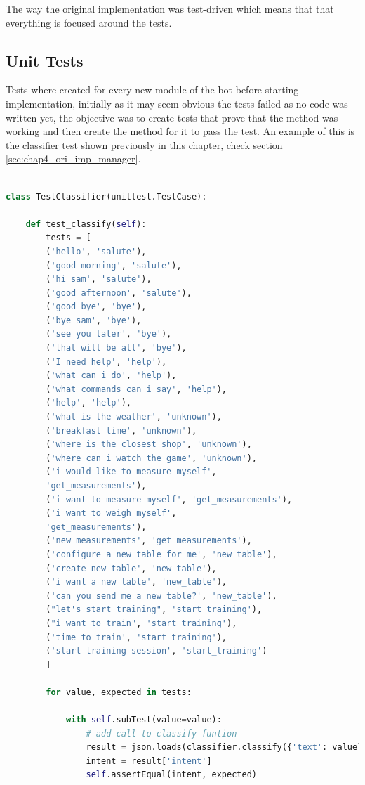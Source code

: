 The way the original implementation was test-driven which means that that everything is focused around the tests.

\subsection{Unit Tests}\label{sec:chap4_test_unit}

Tests where created for every new module of the bot before starting implementation, initially as it may seem obvious the tests failed as no code was written yet, the objective was to create tests that prove that the method was working and then create the method for it to pass the test. An example of this is the classifier test shown previously in this chapter, check section  \ref{sec:chap4_ori_imp_manager}.

\begin{lstlisting}[language=Python]

class TestClassifier(unittest.TestCase):

	def test_classify(self):
		tests = [
		('hello', 'salute'),
		('good morning', 'salute'),
		('hi sam', 'salute'),
		('good afternoon', 'salute'),
		('good bye', 'bye'),
		('bye sam', 'bye'),
		('see you later', 'bye'),
		('that will be all', 'bye'),
		('I need help', 'help'),
		('what can i do', 'help'),
		('what commands can i say', 'help'),
		('help', 'help'),
		('what is the weather', 'unknown'),
		('breakfast time', 'unknown'),
		('where is the closest shop', 'unknown'),
		('where can i watch the game', 'unknown'),
		('i would like to measure myself',
		'get_measurements'),
		('i want to measure myself', 'get_measurements'),
		('i want to weigh myself',
		'get_measurements'),
		('new measurements', 'get_measurements'),
		('configure a new table for me', 'new_table'),
		('create new table', 'new_table'),
		('i want a new table', 'new_table'),
		('can you send me a new table?', 'new_table'),
		("let's start training", 'start_training'),
		("i want to train", 'start_training'),
		('time to train', 'start_training'),
		('start training session', 'start_training')
		]
		
		for value, expected in tests:
		
			with self.subTest(value=value):
				# add call to classify funtion
				result = json.loads(classifier.classify({'text': value}))
				intent = result['intent']
				self.assertEqual(intent, expected)

\end{lstlisting}

